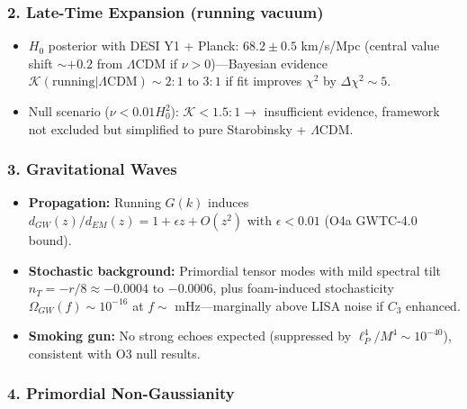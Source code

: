 \documentclass[12pt,a4paper]{article}
\begin{document}
\subsubsection{2. Late-Time Expansion (running vacuum)}

\begin{itemize}
\item \(H_0\) posterior with DESI Y1 + Planck: \(68.2 \pm 0.5\) km/s/Mpc (central value shift \(\sim +0.2\) from \(\Lambda\)CDM if \(\nu > 0\))—Bayesian evidence \(\mathcal{K}(\text{running} | \Lambda\text{CDM}) \sim 2:1\) to \(3:1\) if fit improves \(\chi^2\) by \(\Delta\chi^2 \sim 5\).
\item Null scenario (\(\nu < 0.01 H_0^2\)): \(\mathcal{K} < 1.5:1 \to\) insufficient evidence, framework not excluded but simplified to pure Starobinsky + \(\Lambda\)CDM.
\end{itemize}

\subsubsection{3. Gravitational Waves}

\begin{itemize}
\item \textbf{Propagation:} Running \(G(k)\) induces \(d_{GW}(z)/d_{EM}(z) = 1 + \epsilon z + O(z^2)\) with \(\epsilon < 0.01\) (O4a GWTC-4.0 bound).
\item \textbf{Stochastic background:} Primordial tensor modes with mild spectral tilt \(n_T = -r/8 \approx -0.0004\) to \(-0.0006\), plus foam-induced stochasticity \(\Omega_{GW}(f) \sim 10^{-16}\) at \(f \sim\) mHz—marginally above LISA noise if \(C_3\) enhanced.
\item \textbf{Smoking gun:} No strong echoes expected (suppressed by \(\ell_P^4/M^4 \sim 10^{-40}\)), consistent with O3 null results.
\end{itemize}

\subsubsection{4. Primordial Non-Gaussianity}
\end{document}

